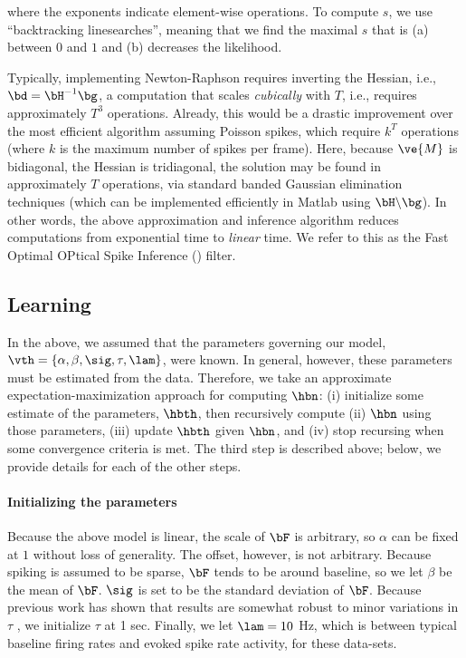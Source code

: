 \noindent where the exponents indicate element-wise operations. To compute $s$, we use ``backtracking linesearches'', meaning that we find the maximal $s$ that is (a) between $0$ and $1$ and (b) decreases the likelihood.

Typically, implementing Newton-Raphson requires inverting the Hessian, i.e., $\bd = \bH^{-1} \bg$, a computation that scales \emph{cubically} with $T$, i.e., requires approximately $T^3$ operations. Already, this would be a drastic improvement over the most efficient algorithm assuming Poisson spikes, which require $k^T$ operations (where $k$ is the maximum number of spikes per frame).  Here, because $\ve{M}$ is bidiagonal, the Hessian is tridiagonal, the solution may be found in approximately $T$ operations, via standard banded Gaussian elimination techniques (which can be implemented efficiently in Matlab using $\bH \backslash \bg$). In other words, the above approximation and inference algorithm reduces computations from exponential time to \emph{linear} time. We refer to this as the Fast Optimal OPtical Spike Inference (\foopsi) filter.





\subsection{Learning} \label{sec:learn}

In the above, we assumed that the parameters governing our model, $\vth=\{\alpha, \beta, \sig, \tau, \lam\}$, were known. In general, however, these parameters must be estimated from the data. Therefore, we take an approximate expectation-maximization approach for computing $\hbn$: (i) initialize some estimate of the parameters, $\hbth$, then recursively compute (ii) $\hbn$ using those parameters, (iii) update $\hbth$ given $\hbn$, and (iv) stop recursing when some convergence criteria is met.  The third step is described above; below, we provide details for each of the other steps.

\paragraph{Initializing the parameters}

Because the above model is linear, the scale of $\bF$ is arbitrary, so $\alpha$ can be fixed at $1$ without loss of generality.  The offset, however, is not arbitrary.  Because spiking is assumed to be sparse, $\bF$ tends to be around baseline, so we let $\beta$ be the mean of $\bF$.  $\sig$ is set to be the standard deviation of $\bF$.  Because previous work has shown that results are somewhat robust to minor variations in $\tau$ \cite{YaksiFriedrich06}, we initialize $\tau$ at 1 sec.  Finally, we let $\lam=10$ Hz, which is between typical baseline firing rates and evoked spike rate activity, for these data-sets.


